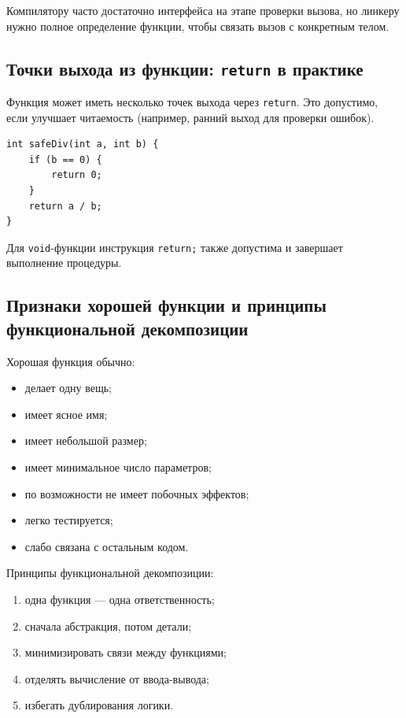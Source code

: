 \begin{remark}
Компилятору часто достаточно интерфейса на этапе проверки вызова, но линкеру нужно полное определение функции, чтобы связать вызов с конкретным телом.
\end{remark}

\subsection{Точки выхода из функции: \texttt{return} в практике}
Функция может иметь несколько точек выхода через \texttt{return}. Это допустимо, если улучшает читаемость (например, ранний выход для проверки ошибок).

\begin{example}
\begin{verbatim}
int safeDiv(int a, int b) {
    if (b == 0) {
        return 0;
    }
    return a / b;
}
\end{verbatim}
\end{example}

Для \texttt{void}-функции инструкция \texttt{return;} также допустима и завершает выполнение процедуры.

\subsection{Признаки хорошей функции и принципы функциональной декомпозиции}
Хорошая функция обычно:
\begin{itemize}
    \item делает одну вещь;
    \item имеет ясное имя;
    \item имеет небольшой размер;
    \item имеет минимальное число параметров;
    \item по возможности не имеет побочных эффектов;
    \item легко тестируется;
    \item слабо связана с остальным кодом.
\end{itemize}

Принципы функциональной декомпозиции:
\begin{enumerate}
    \item одна функция — одна ответственность;
    \item сначала абстракция, потом детали;
    \item минимизировать связи между функциями;
    \item отделять вычисление от ввода-вывода;
    \item избегать дублирования логики.
\end{enumerate}

